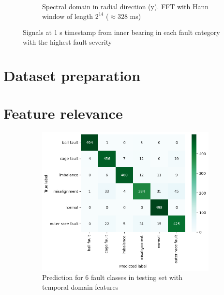 \begin{figure}[ht]
\begin{subfigure}[b]{0.55\textwidth}
        \caption{Spectral domain in radial direction (y). FFT with Hann window of length $2^{14}$ ($\approx 328$ ms)}
    \end{subfigure} 
    \caption{Signals at 1 s timestamp from inner bearing in each fault category with the highest fault severity}
\end{figure}


\section{Dataset preparation}


\section{Feature relevance}

\begin{figure}[ht]
    \centering
    \begin{subfigure}[b]{0.49\textwidth}
        \includegraphics[width=\textwidth]{assets/design/kNN-temporal-confusion-matrix-fault.png}
        \caption{Prediction for 6 fault classes in testing set with temporal domain features}
    \end{subfigure}
    \hfill
    \begin{subfigure}[b]{0.49\textwidth}

\end{subfigure}
\end{figure}
